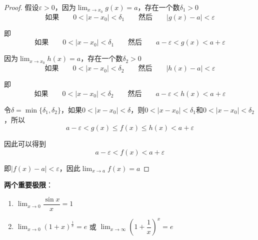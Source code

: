 \begin{proof}
    假设$\varepsilon>0$，因为$\displaystyle\lim_{x\rightarrow x_0} g(x) = a$，存在一个数$\delta_1>0$
    \begin{equation}
        \mbox{如果} \qquad 0<\left|x - x_0\right| <\delta_1 \qquad \mbox{然后} \qquad \left|g(x) - a\right| < \varepsilon \nonumber
    \end{equation}

    即
    \begin{equation}
        \mbox{如果} \qquad 0<\left|x - x_0\right| <\delta_1 \qquad \mbox{然后} \qquad a-\varepsilon < g(x) < a+\varepsilon \nonumber
    \end{equation}

    因为$\displaystyle\lim_{x\rightarrow x_0} h(x) = a$，存在一个数$\delta_2>0$
    \begin{equation}
        \mbox{如果} \qquad 0<\left|x - x_0\right| <\delta_2 \qquad \mbox{然后} \qquad \left|h(x) - a\right| < \varepsilon \nonumber
    \end{equation}

    即
    \begin{equation}
        \mbox{如果} \qquad 0<\left|x - x_0\right| <\delta_2 \qquad \mbox{然后} \qquad a-\varepsilon < h(x) < a+\varepsilon \nonumber
    \end{equation}

    令$\delta = \min\{ \delta_1, \delta_2 \}$，如果$0<\left|x-x_0\right|<\delta$，则$0<\left|x-x_0\right|<\delta_1$和$0<\left|x-x_0\right|<\delta_2$，所以
    \begin{equation}
        a-\varepsilon<g(x)\leq f(x)\leq h(x) < a+\varepsilon \nonumber
    \end{equation} 

    因此可以得到
    \begin{equation}
        a-\varepsilon < f(x) < a+\varepsilon \nonumber
    \end{equation}

    即$\left|f(x)-a\right|<\varepsilon$，因此$\displaystyle\lim_{x\rightarrow a}f(x) = a$
\end{proof}

\vspace{2mm}
\textbf{两个重要极限}：
\vspace{2mm}
\begin{enumerate}
    \item $\displaystyle\lim_{x\rightarrow 0} \dfrac{\sin x}{x} = 1$
    \item $\displaystyle\lim_{x\rightarrow 0} (1+x)^{\frac{1}{x}} = e$ \quad 或 \quad $\displaystyle\lim_{x\rightarrow\infty} (1+\dfrac{1}{x})^x = e$
\end{enumerate}

